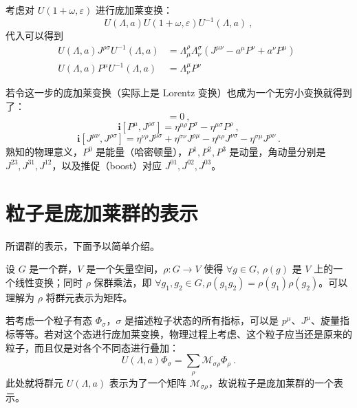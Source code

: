 考虑对 $U(1+\omega, \varepsilon)$ 进行庞加莱变换： 
\begin{equation}
	U(\Lambda, a) U(1+\omega, \varepsilon) U^{-1}(\Lambda, a) ~,
\end{equation}
代入可以得到 
\begin{equation}
	\begin{aligned}
		U(\Lambda, a) J^{\rho \sigma} U^{-1}(\Lambda, a) &= \Lambda_{\mu}^\rho \Lambda_\nu ^\sigma(J^{\mu\nu} - a^\mu P^\nu + a^\nu P^\mu) \\ 
		U(\Lambda, a) P^\mu U^{-1}(\Lambda, a) &= \Lambda_{\nu}^\mu P^\nu ~~
	\end{aligned}~~
\end{equation}

若令这一步的庞加莱变换（实际上是 Lorentz 变换）也成为一个无穷小变换就得到了：
\begin{equation}
	[P^\mu, P^\nu] = 0 ~,
\end{equation}
\begin{equation}
	\mathbf{i} [P^\mu, J^{\rho \sigma}] = \eta^{\mu \rho} P^\sigma - \eta^{\mu \sigma} P^\rho ~,
\end{equation}
\begin{equation}
	\mathbf{i} [J^{\mu\nu}, J^{\rho \sigma}] = \eta^{\nu \rho} J^{\mu \sigma} + \eta^{\sigma \nu} J^{\rho \mu} - \eta^{\mu \rho} J^{\nu \sigma} - \eta^{\sigma \mu} J^{\rho \nu} ~.
\end{equation}
熟知的物理意义，$P^0$ 是能量（哈密顿量），$P^{1}, P^2, P^3$ 是动量，角动量分别是 $J^{23}, J^{31}, J^{12}$，以及推促（boost）对应 $J^{01}, J^{02}, J^{03}$。

\section{粒子是庞加莱群的表示}
所谓群的表示，下面予以简单介绍。
\begin{definition}
	设 $G$ 是一个群，$V$ 是一个矢量空间，$\rho: G \to V$ 使得 $\forall g \in G$, $\rho(g)$ 是 $V$ 上的一个线性变换；同时 $\rho$ 保群乘法，即 $\forall g_1, g_2 \in G, \rho(g_1 g_2) = \rho(g_1) \rho(g_2)$。可以理解为 $\rho$ 将群元表示为矩阵。
\end{definition}

若考虑一个粒子有态 $\Phi_{\sigma}$，$\sigma$ 是描述粒子状态的所有指标，可以是 $p^\mu$、$J^\mu$、旋量指标等等。若对这个态进行庞加莱变换，物理过程上考虑、这个粒子应当还是原来的粒子，而且仅是对各个不同态进行叠加：
\begin{equation}
	U(\Lambda, a) \Phi_\sigma = \sum_{\rho }\mathcal M_{\sigma \rho} \Phi_{\rho} ~.
\end{equation}
此处就将群元 $U(\Lambda, a)$ 表示为了一个矩阵 $\mathcal M_{\sigma \rho}$，故说粒子是庞加莱群的一个表示。


